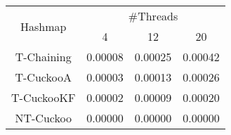 \begin{tabular}{|c|c|c|c|}
\hline
\multirow{2}{*}{Hashmap} & \multicolumn{3}{c|}{\#Threads}\\\cline{2-4}& 4 & 12 & 20\\
\hline
\hline
T-Chaining & 0.00008 & 0.00025 & 0.00042\\
T-CuckooA & 0.00003 & 0.00013 & 0.00026\\
T-CuckooKF & 0.00002 & 0.00009 & 0.00020\\
NT-Cuckoo & 0.00000 & 0.00000 & 0.00000\\
\hline
\end{tabular}
